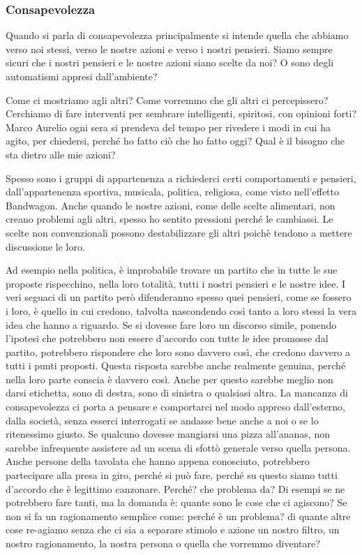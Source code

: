 \documentclass[12pt]{book} %
\begin{document}
\subsubsection{Consapevolezza}
Quando si parla di consapevolezza principalmente si intende quella che abbiamo verso noi stessi, verso le nostre azioni e
verso i nostri pensieri. Siamo sempre sicuri che i nostri pensieri e le nostre azioni siano scelte da noi? O sono degli automatismi appresi dall'ambiente? 

Come ci mostriamo agli altri? Come vorremmo che gli altri ci percepissero? Cerchiamo di fare interventi per sembrare intelligenti, spiritosi, con opinioni forti? Marco Aurelio ogni sera si prendeva del tempo per rivedere i modi in cui ha agito, per chiedersi, perché ho fatto ciò che ho fatto oggi? Qual è il bisogno che sta dietro alle mie azioni? 

Spesso sono i gruppi di appartenenza a richiederci certi comportamenti e pensieri, dall'appartenenza sportiva, musicala, politica, religiosa, come visto nell'effetto Bandwagon. Anche quando le nostre azioni, come delle scelte alimentari, non creano problemi agli altri, spesso ho sentito pressioni perché le cambiassi. Le scelte non convenzionali possono destabilizzare gli altri poichè tendono a mettere discussione le loro.

Ad esempio nella politica, è improbabile trovare un partito che in tutte le sue proposte rispecchino, nella loro totalità,
 tutti i nostri pensieri e le nostre idee. I veri seguaci di un partito però difenderanno spesso quei pensieri, come se
fossero i loro, è quello in cui credono, talvolta nascondendo così tanto a loro stessi la vera idea che hanno a riguardo. Se si
dovesse fare loro un discorso simile, ponendo l'ipotesi che potrebbero non essere
d'accordo con tutte le idee promosse dal partito, potrebbero rispondere che loro sono davvero così, che
credono davvero a tutti i punti proposti. Questa risposta sarebbe anche realmente genuina, perché nella loro parte
conscia è davvero così. Anche per questo sarebbe meglio non darsi etichetta, sono di destra, sono di sinistra o
qualsiasi altra. La mancanza di consapevolezza ci porta a pensare e comportarci nel modo appreso
dall'esterno, dalla società, senza esserci interrogati se andasse bene anche a noi o se lo ritenessimo giusto.
Se qualcuno dovesse mangiarsi una pizza all'ananas, non sarebbe infrequente assistere ad un scena di sfottò generale verso quella persona. Anche persone della tavolata che hanno appena conosciuto, potrebbero partecipare alla presa in giro, perché si può fare, perché su questo siamo tutti d'accordo che è legittimo canzonare. Perché? che problema da? Di esempi se ne potrebbero fare tanti, ma la domanda è: quante sono le cose che ci agiscono? Se non si fa un ragionamento semplice come: perché è un problema? di quante altre cose re-agiamo senza che ci sia a separare stimolo e azione un nostro filtro, un nostro ragionamento, la nostra persona o quella che vorremmo diventare?
\end{document}
